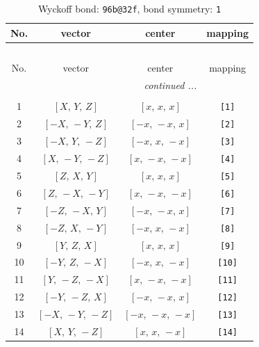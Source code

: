 \documentclass[fleqn,8pt]{jsarticle}
\begin{document}
\begin{longtable}{cccc}
\caption{Wyckoff bond: {\tt 96b@32f}, bond symmetry: {\tt 1}}
 \\
 \hline \hline
No. & vector & center & mapping \\ \hline \endfirsthead

\multicolumn{3}{l}{\tablename\ \thetable{}} \\
 \hline \hline
No. & vector & center & mapping \\ \hline \endhead

 \hline \hline
\multicolumn{3}{r}{\footnotesize\it continued ...} \\ \endfoot

 \hline \hline
\multicolumn{3}{r}{} \\ \endlastfoot

1 & $\left[ X,\, Y,\, Z \right]$ & $\left[ x,\, x,\, x \right]$ & {\tt [1]} \\ \hline
2 & $\left[ - X,\, - Y,\, Z \right]$ & $\left[ - x,\, - x,\, x \right]$ & {\tt [2]} \\ \hline
3 & $\left[ - X,\, Y,\, - Z \right]$ & $\left[ - x,\, x,\, - x \right]$ & {\tt [3]} \\ \hline
4 & $\left[ X,\, - Y,\, - Z \right]$ & $\left[ x,\, - x,\, - x \right]$ & {\tt [4]} \\ \hline
5 & $\left[ Z,\, X,\, Y \right]$ & $\left[ x,\, x,\, x \right]$ & {\tt [5]} \\ \hline
6 & $\left[ Z,\, - X,\, - Y \right]$ & $\left[ x,\, - x,\, - x \right]$ & {\tt [6]} \\ \hline
7 & $\left[ - Z,\, - X,\, Y \right]$ & $\left[ - x,\, - x,\, x \right]$ & {\tt [7]} \\ \hline
8 & $\left[ - Z,\, X,\, - Y \right]$ & $\left[ - x,\, x,\, - x \right]$ & {\tt [8]} \\ \hline
9 & $\left[ Y,\, Z,\, X \right]$ & $\left[ x,\, x,\, x \right]$ & {\tt [9]} \\ \hline
10 & $\left[ - Y,\, Z,\, - X \right]$ & $\left[ - x,\, x,\, - x \right]$ & {\tt [10]} \\ \hline
11 & $\left[ Y,\, - Z,\, - X \right]$ & $\left[ x,\, - x,\, - x \right]$ & {\tt [11]} \\ \hline
12 & $\left[ - Y,\, - Z,\, X \right]$ & $\left[ - x,\, - x,\, x \right]$ & {\tt [12]} \\ \hline
13 & $\left[ - X,\, - Y,\, - Z \right]$ & $\left[ - x,\, - x,\, - x \right]$ & {\tt [13]} \\ \hline
14 & $\left[ X,\, Y,\, - Z \right]$ & $\left[ x,\, x,\, - x \right]$ & {\tt [14]} \\ \hline

\end{longtable}
\end{document}
